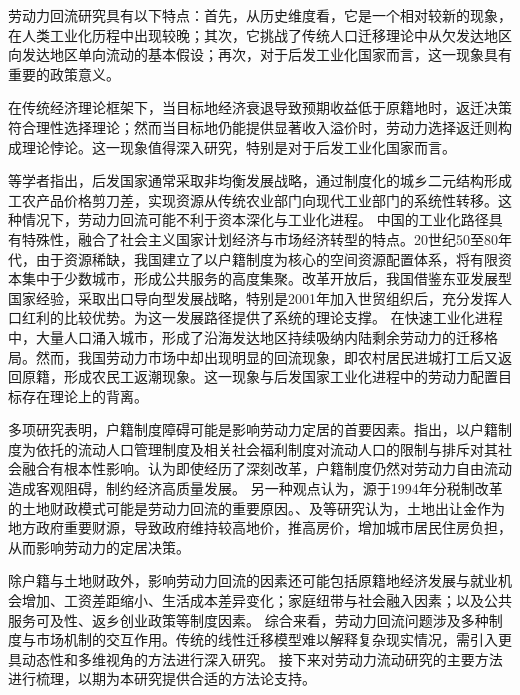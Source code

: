 \documentclass[a4paper, zihao=-4, fontset = mac, oneside]{ctexbook} %
\begin{document}
劳动力回流研究具有以下特点：首先，从历史维度看，它是一个相对较新的现象，在人类工业化历程中出现较晚；其次，它挑战了传统人口迁移理论中从欠发达地区向发达地区单向流动的基本假设；再次，对于后发工业化国家而言，这一现象具有重要的政策意义。

在传统经济理论框架下，当目标地经济衰退导致预期收益低于原籍地时，返迁决策符合理性选择理论；然而当目标地仍能提供显著收入溢价时，劳动力选择返迁则构成理论悖论。这一现象值得深入研究，特别是对于后发工业化国家而言。

\textcite{CaiFangHuJiZhiDuYuLaoDongLiShiChangBaoHu2001}等学者指出，后发国家通常采取非均衡发展战略，通过制度化的城乡二元结构形成工农产品价格剪刀差，实现资源从传统农业部门向现代工业部门的系统性转移。这种情况下，劳动力回流可能不利于资本深化与工业化进程。
中国的工业化路径具有特殊性，融合了社会主义国家计划经济与市场经济转型的特点。20世纪50至80年代，由于资源稀缺，我国建立了以户籍制度为核心的空间资源配置体系，将有限资本集中于少数城市，形成公共服务的高度集聚。改革开放后，我国借鉴东亚发展型国家经验，采取出口导向型发展战略，特别是2001年加入世贸组织后，充分发挥人口红利的比较优势。\textcite{LinYiFuZhongGuoDeJingJiFaZhanZhanLueYuDiQuShouRuChaiJu2003}为这一发展路径提供了系统的理论支撑。
在快速工业化进程中，大量人口涌入城市，形成了沿海发达地区持续吸纳内陆剩余劳动力的迁移格局。然而，我国劳动力市场中却出现明显的回流现象，即农村居民进城打工后又返回原籍，形成农民工返潮现象。这一现象与后发国家工业化进程中的劳动力配置目标存在理论上的背离。

多项研究表明，户籍制度障碍可能是影响劳动力定居的首要因素。\textcite{RenYuanChengShiLiuDongRenKouDeSheHuiRongHeWenXianShuPing2006}指出，以户籍制度为依托的流动人口管理制度及相关社会福利制度对流动人口的限制与排斥对其社会融合有根本性影响。\textcite{LuYiLongHuKouHuanQiZuoYongMaHuJiZhiDuYuSheHuiFenCengHeLiuDong2008}认为即使经历了深刻改革，户籍制度仍然对劳动力自由流动造成客观阻碍，制约经济高质量发展。
另一种观点认为，源于1994年分税制改革的土地财政模式可能是劳动力回流的重要原因。\textcite{ChenYingFangNongMinGongZhiDuAnPaiYuShenFenRenTong2005}、\textcite{niehuihuaZhongguogaofangjiadexinzhengzhijingjixuejieshiYiZhengqihemou2013}及\textcite{YuJianXingDiFangFaZhanXingZhengFuDeXingWeiLuoJiJiZhiDuJiChu2012}等研究认为，土地出让金作为地方政府重要财源，导致政府维持较高地价，推高房价，增加城市居民住房负担，从而影响劳动力的定居决策。

除户籍与土地财政外，影响劳动力回流的因素还可能包括原籍地经济发展与就业机会增加、工资差距缩小、生活成本差异变化；家庭纽带与社会融入因素；以及公共服务可及性、返乡创业政策等制度因素。
综合来看，劳动力回流问题涉及多种制度与市场机制的交互作用。传统的线性迁移模型难以解释复杂现实情况，需引入更具动态性和多维视角的方法进行深入研究。
接下来对劳动力流动研究的主要方法进行梳理，以期为本研究提供合适的方法论支持。
\end{document}
